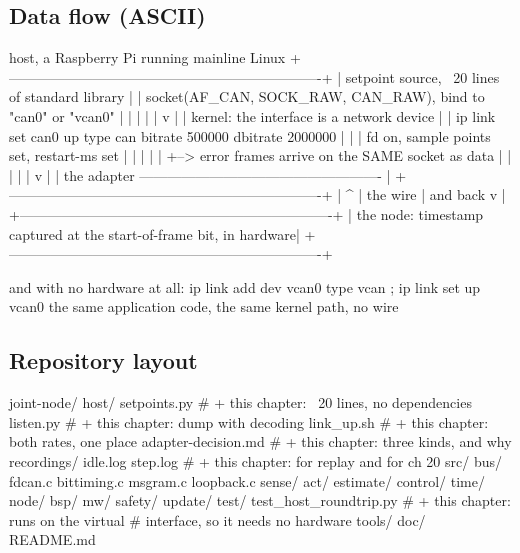 \subsection*{Data flow (ASCII)}

\begin{asciiart}
  host, a Raspberry Pi running mainline Linux
  +-------------------------------------------------------------------+
  | setpoint source, ~20 lines of standard library                     |
  |   socket(AF_CAN, SOCK_RAW, CAN_RAW), bind to "can0" or "vcan0"     |
  |        |                                                          |
  |        v                                                          |
  | kernel: the interface is a network device                         |
  |   ip link set can0 up type can bitrate 500000 dbitrate 2000000    |
  |        |          fd on, sample points set, restart-ms set        |
  |        |                                                          |
  |        +--> error frames arrive on the SAME socket as data        |
  |        |                                                          |
  |        v                                                          |
  | the adapter  ---------------------------------------------------- |
  +-------------------------------------------------------------------+
           |                                    ^
           | the wire                           | and back
           v                                    |
  +-------------------------------------------------------------------+
  | the node: timestamp captured at the start-of-frame bit, in hardware|
  +-------------------------------------------------------------------+

  and with no hardware at all:
      ip link add dev vcan0 type vcan ; ip link set up vcan0
      the same application code, the same kernel path, no wire
\end{asciiart}

\subsection*{Repository layout}

\begin{plaincode}
joint-node/
  host/
    setpoints.py                    # + this chapter: ~20 lines, no dependencies
    listen.py                       # + this chapter: dump with decoding
    link_up.sh                      # + this chapter: both rates, one place
    adapter-decision.md             # + this chapter: three kinds, and why
    recordings/
      idle.log  step.log            # + this chapter: for replay and for ch 20
  src/
    bus/ fdcan.c bittiming.c msgram.c loopback.c
    sense/ act/ estimate/ control/ time/ node/ bsp/
    mw/  safety/  update/
  test/
    test_host_roundtrip.py          # + this chapter: runs on the virtual
                                    #   interface, so it needs no hardware
  tools/  doc/  README.md
\end{plaincode}

